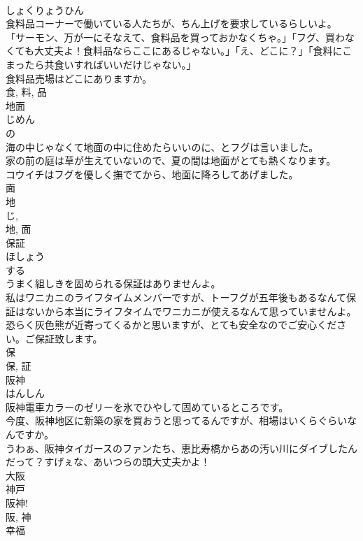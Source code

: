 \documentclass[8pt]{extreport}
\begin{document}
\begin{CJK}{UTF8}{min}
\\	しょくりょうひん	
\\	食料品コーナーで働いている人たちが、ちん上げを要求しているらしいよ。	
\\	「サーモン、万が一にそなえて、食料品を買っておかなくちゃ。」「フグ、買わなくても大丈夫よ！食料品ならここにあるじゃない。」「え、どこに？」「食料にこまったら共食いすればいいだけじゃない。」	
\\	食料品売場はどこにありますか。	
\\	食, 料, 品	
\\	地面	
\\	じめん	
\\	の 
\\	海の中じゃなくて地面の中に住めたらいいのに、とフグは言いました。	
\\	家の前の庭は草が生えていないので、夏の間は地面がとても熱くなります。	
\\	コウイチはフグを優しく撫でてから、地面に降ろしてあげました。	
\\	面 
\\	地 
\\	じ, 
\\	地, 面	
\\	保証	
\\	ほしょう	
\\	する 
\\	うまく組しきを固められる保証はありませんよ。	
\\	私はワニカニのライフタイムメンバーですが、トーフグが五年後もあるなんて保証はないから本当にライフタイムでワニカニが使えるなんて思っていませんよ。	
\\	恐らく灰色熊が近寄ってくるかと思いますが、とても安全なのでご安心ください。ご保証致します。	
\\	保 
\\	保, 証	
\\	阪神	
\\	はんしん	
\\	阪神電車カラーのゼリーを氷でひやして固めているところです。	
\\	今度、阪神地区に新築の家を買おうと思ってるんですが、相場はいくらぐらいなんですか。	
\\	うわぁ、阪神タイガースのファンたち、恵比寿橋からあの汚い川にダイブしたんだって？すげぇな、あいつらの頭大丈夫かよ！	
\\	大阪 
\\	神戸 
\\	阪神! 
\\	阪, 神	
\\	幸福	

\end{CJK}
\end{document}

